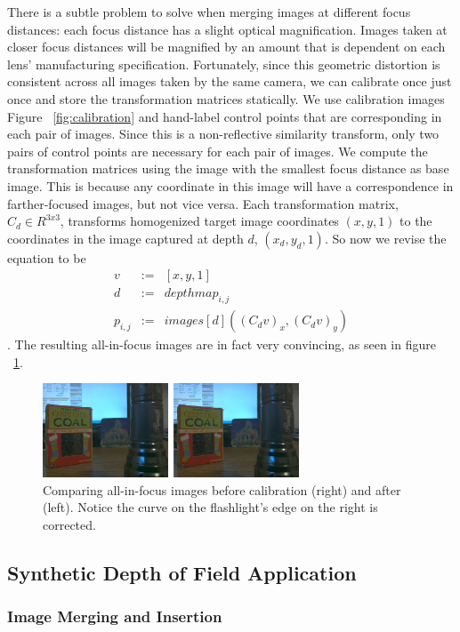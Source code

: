 \documentclass[annual]{acmsiggraph}
\begin{document}
There is a subtle problem to solve when merging images at different focus distances: each focus distance has a slight optical magnification.  Images taken at closer focus distances will be magnified by an amount that is dependent on each lens' manufacturing specification.  Fortunately, since this geometric distortion is consistent across all images taken by the same camera, we can calibrate once just once and store the transformation matrices statically. We use calibration images Figure ~\ref{fig:calibration} and hand-label control points that are corresponding in each pair of images. Since this is a non-reflective similarity transform, only two pairs of control points are necessary for each pair of images.  We compute the transformation matrices using the image with the smallest focus distance as base image.  This is because any coordinate in this image will have a correspondence in farther-focused images, but not vice versa.  Each transformation matrix, $C_d\in R^{3x3}$, transforms homogenized target image coordinates $(x,y,1)$ to the coordinates in the image captured at depth $d$, $(x_d,y_d,1)$. So now we revise the equation to be
\begin{eqnarray} 
v &:=& [x,y,1] \nonumber \\
d &:=& depthmap_{i,j}  \nonumber \\
p_{i,j} &:=& images[ d ]( (C_d v)_x, (C_d v)_y)
\end{eqnarray}. The resulting all-in-focus images are in fact very convincing, as seen in figure ~\ref{fig:all-focus-calibrated}.

\begin{figure}
\centering
\includegraphics[width=3in]{images/all-focus-calibrated.jpg}
\caption{Comparing all-in-focus images before calibration (right) and after (left). Notice the curve on the flashlight's edge on the right is corrected.}
\label{fig:all-focus-calibrated}
\end{figure}


\subsection{Synthetic Depth of Field Application}
\subsubsection{Image Merging and Insertion}
\end{document}
